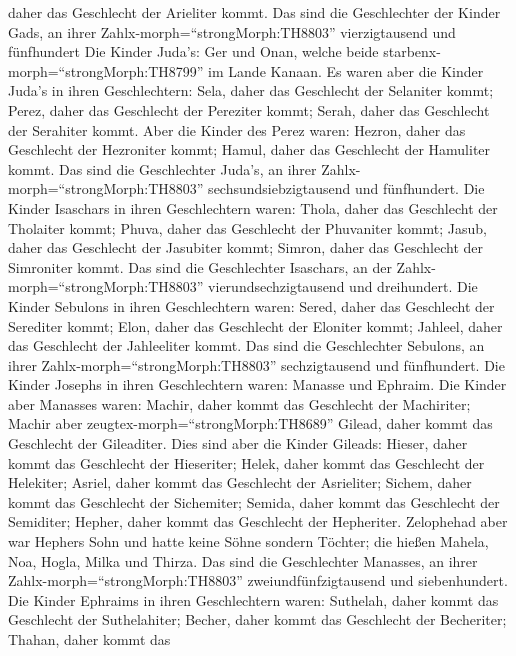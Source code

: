 daher das Geschlecht der Arieliter kommt.  Das sind die
Geschlechter der Kinder Gads, an ihrer
Zahlx-morph=``strongMorph:TH8803'' vierzigtausend und fünfhundert
 Die Kinder Juda's: Ger und Onan, welche beide
starbenx-morph=``strongMorph:TH8799'' im Lande Kanaan.  Es
waren aber die Kinder Juda's in ihren Geschlechtern: Sela, daher das
Geschlecht der Selaniter kommt; Perez, daher das Geschlecht der
Pereziter kommt; Serah, daher das Geschlecht der Serahiter kommt.
 Aber die Kinder des Perez waren: Hezron, daher das
Geschlecht der Hezroniter kommt; Hamul, daher das Geschlecht der
Hamuliter kommt.  Das sind die Geschlechter Juda's, an
ihrer Zahlx-morph=``strongMorph:TH8803'' sechsundsiebzigtausend und
fünfhundert.  Die Kinder Isaschars in ihren Geschlechtern
waren: Thola, daher das Geschlecht der Tholaiter kommt; Phuva, daher das
Geschlecht der Phuvaniter kommt;  Jasub, daher das
Geschlecht der Jasubiter kommt; Simron, daher das Geschlecht der
Simroniter kommt.  Das sind die Geschlechter Isaschars, an
der Zahlx-morph=``strongMorph:TH8803'' vierundsechzigtausend und
dreihundert.  Die Kinder Sebulons in ihren Geschlechtern
waren: Sered, daher das Geschlecht der Serediter kommt; Elon, daher das
Geschlecht der Eloniter kommt; Jahleel, daher das Geschlecht der
Jahleeliter kommt.  Das sind die Geschlechter Sebulons, an
ihrer Zahlx-morph=``strongMorph:TH8803'' sechzigtausend und fünfhundert.
 Die Kinder Josephs in ihren Geschlechtern waren: Manasse
und Ephraim.  Die Kinder aber Manasses waren: Machir, daher
kommt das Geschlecht der Machiriter; Machir aber
zeugtex-morph=``strongMorph:TH8689'' Gilead, daher kommt das Geschlecht
der Gileaditer.  Dies sind aber die Kinder Gileads: Hieser,
daher kommt das Geschlecht der Hieseriter; Helek, daher kommt das
Geschlecht der Helekiter;  Asriel, daher kommt das
Geschlecht der Asrieliter; Sichem, daher kommt das Geschlecht der
Sichemiter;  Semida, daher kommt das Geschlecht der
Semiditer; Hepher, daher kommt das Geschlecht der Hepheriter.
 Zelophehad aber war Hephers Sohn und hatte keine Söhne
sondern Töchter; die hießen Mahela, Noa, Hogla, Milka und Thirza.
 Das sind die Geschlechter Manasses, an ihrer
Zahlx-morph=``strongMorph:TH8803'' zweiundfünfzigtausend und
siebenhundert.  Die Kinder Ephraims in ihren Geschlechtern
waren: Suthelah, daher kommt das Geschlecht der Suthelahiter; Becher,
daher kommt das Geschlecht der Becheriter; Thahan, daher kommt das
